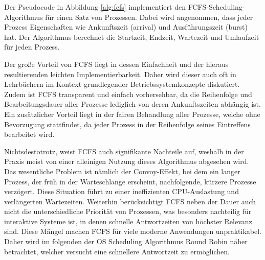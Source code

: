 Der Pseudocode in Abbildung \ref{alg:fcfs} implementiert den \ac{FCFS}-Scheduling-Algorithmus für einen Satz von Prozessen. Dabei wird angenommen, dass jeder Prozess Eigenschaften wie Ankunftszeit (arrival) und Ausführungszeit (burst) hat. Der Algorithmus berechnet die Startzeit, Endzeit, Wartezeit und Umlaufzeit für jeden Prozess. 

Der große Vorteil von \ac{FCFS} liegt in dessen Einfachheit und der hieraus resultierenden leichten Implementierbarkeit. Daher wird dieser auch oft in Lehrbüchern im Kontext grundlegender Betriebssystemkonzepte diskutiert. %
Zudem ist \ac{FCFS} transparent und einfach vorhersehbar, da die Reihenfolge und Bearbeitungsdauer aller Prozesse lediglich von deren Ankunftszeiten abhängig ist. Ein zusätzlicher Vorteil liegt in der fairen Behandlung aller Prozesse, welche ohne Bevorzugung stattfindet, da jeder Prozess in der Reihenfolge seines Eintreffens bearbeitet wird. %

Nichtsdestotrotz, weist \ac{FCFS} auch signifikante Nachteile auf, weshalb in der Praxis meist von einer alleinigen Nutzung dieses Algorithmus abgesehen wird. Das wesentliche Problem ist nämlich der Convoy-Effekt, bei dem ein langer Prozess, der früh in der Warteschlange erscheint, nachfolgende, kürzere Prozesse verzögert. Diese Situation führt zu einer ineffizienten \ac{CPU}-Auslastung und verlängerten Wartezeiten. %
Weiterhin berücksichtigt \ac{FCFS} neben der Dauer auch nicht die unterschiedliche Priorität von Prozessen, was besonders nachteilig für interaktive Systeme ist, in denen schnelle Antwortzeiten von höchster Relevanz sind. Diese Mängel machen \ac{FCFS} für viele moderne Anwendungen unpraktikabel. Daher wird im folgenden der OS Scheduling Algorithmus Round Robin näher betrachtet, welcher versucht eine schnellere Antwortzeit zu ermöglichen.


